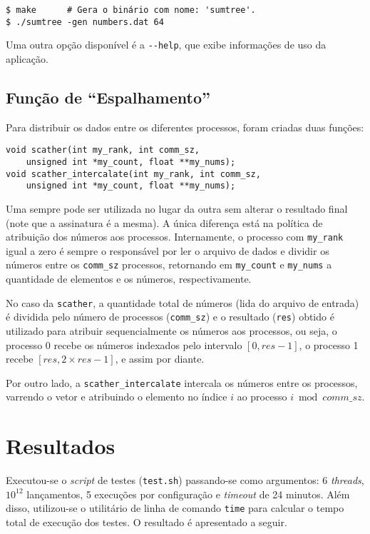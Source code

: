 \documentclass[12pt,a4paper]{article}
\begin{document}
\begin{verbatim}
$ make      # Gera o binário com nome: 'sumtree'.
$ ./sumtree -gen numbers.dat 64
\end{verbatim}

Uma outra opção disponível é a \texttt{-{}-help}, que exibe informações de uso da
aplicação.


\subsection{Função de ``Espalhamento''}
Para distribuir os dados entre os diferentes processos, foram criadas duas
funções:

\begin{verbatim}
void scather(int my_rank, int comm_sz,
    unsigned int *my_count, float **my_nums);
void scather_intercalate(int my_rank, int comm_sz,
    unsigned int *my_count, float **my_nums);
\end{verbatim}

Uma sempre pode ser utilizada no lugar da outra sem alterar o resultado final
(note que a assinatura é a mesma). A única diferença está na política de
atribuição dos números aos processos. Internamente, o processo com
\texttt{my\_rank} igual a zero é sempre o responsável por ler o arquivo de dados
e dividir os números entre os \texttt{comm\_sz} processos, retornando em
\texttt{my\_count} e \texttt{my\_nums} a quantidade de elementos e os números,
respectivamente.

No caso da \texttt{scather}, a quantidade total de números (lida do arquivo de
entrada) é dividida pelo número de processos (\texttt{comm\_sz}) e o resultado
(\texttt{res}) obtido é utilizado para atribuir sequencialmente os números aos
processos, ou seja, o processo 0 recebe os números indexados pelo intervalo $[0,
res - 1]$, o processo 1 recebe $[res, 2 \times res - 1]$, e assim por diante.

Por outro lado, a \texttt{scather\_intercalate} intercala os números entre os
processos, varrendo o vetor e atribuindo o elemento no índice $i$ ao processo $i
\bmod comm\_sz$. 

\section{Resultados}
\label{sec:resultados}
Executou-se o \textit{script} de testes (\texttt{test.sh}) passando-se como
argumentos: 6 \textit{threads}, $10^{12}$ lançamentos, 5 execuções por
configuração e \textit{timeout} de 24 minutos. Além disso, utilizou-se o
utilitário de linha de comando \texttt{time} para calcular o tempo total de
execução dos testes. O resultado é apresentado a seguir.
\end{document}
